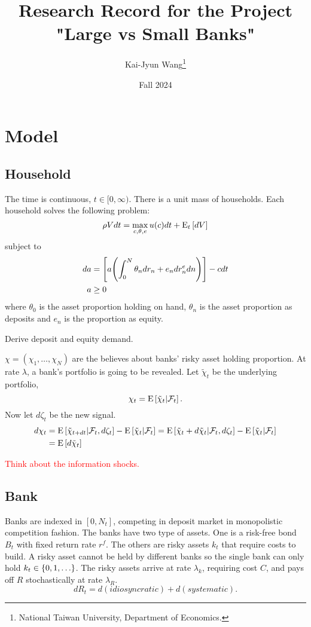 \documentclass[a4paper, 12pt]{article}
\title{Research Record for the Project "Large vs Small Banks"}
\author{Kai-Jyun Wang\thanks{National Taiwan University, Department of Economics.}}
\date{Fall 2024}
\begin{document}
 
\maketitle

\section{Model} 
\subsection{Household}
The time is continuous, $t\in[0,\infty)$. There is a unit mass of households. 
Each household solves the following problem:
\begin{equation}
    \rho Vdt = \max_{c,\theta,e} u(c)dt + {\operatorname{E}}_t\left[ {dV} \right]
\end{equation}
subject to 
\begin{align}
    da &= \sbrc{a\pth{\int_0^N\theta_ndr_n + e_ndr^e_ndn}} - cdt \\
    a &\geq 0
\end{align}
where $\theta_0$ is the asset proportion holding on hand, $\theta_n$ is the asset 
proportion as deposits and $e_n$ is the proportion as equity. 

Derive deposit and equity demand. 

$\chi = (\chi_1,\ldots,\chi_N)$ are the believes about 
banks' risky asset holding proportion. At rate $\lambda$, 
a bank's portfolio is going to be revealed. Let $\tilde{\chi}_t$ 
be the underlying portfolio, 
\begin{equation*}
    \chi_t = {\operatorname{E}}\left[ {\tilde{\chi}_t|\mathcal{F}_t} \right]. 
\end{equation*}
Now let $d\zeta_t$ be the new signal. 
\begin{equation*}
    \begin{split}
        d\chi_t &= {\operatorname{E}}\left[ {\tilde{\chi}_{t+dt}|\mathcal{F}_t,d\zeta_t} \right] - {\operatorname{E}}\left[ {\tilde{\chi}_t|\mathcal{F}_t} \right]
        = {\operatorname{E}}\left[ {\tilde{\chi}_t + d\tilde{\chi}_t|\mathcal{F}_t,d\zeta_t} \right] - {\operatorname{E}}\left[ {\tilde{\chi}_t|\mathcal{F}_t} \right] \\ 
        &= {\operatorname{E}}\left[ {d\tilde{\chi}_t} \right]
    \end{split}
\end{equation*}

\textcolor{red}{Think about the information shocks.}

\subsection{Bank}
Banks are indexed in $[0,N_t]$, competing in deposit market in monopolistic 
competition fashion. The banks have two type of assets. One is a risk-free bond 
$B_t$ with fixed return rate $r^f$. The others are risky assets $k_t$ that require 
costs to build. A risky asset cannot be held by different banks so the single bank 
can only hold $k_t\in\left\{ {0,1,\ldots} \right\}$. The risky assets arrive at rate $\lambda_k$, 
requiring cost $C$, and pays off $R$ stochastically at rate $\lambda_R$. 
\begin{equation*}
    dR_t = d(idiosyncratic) + d(systematic).
\end{equation*}
\end{document}
